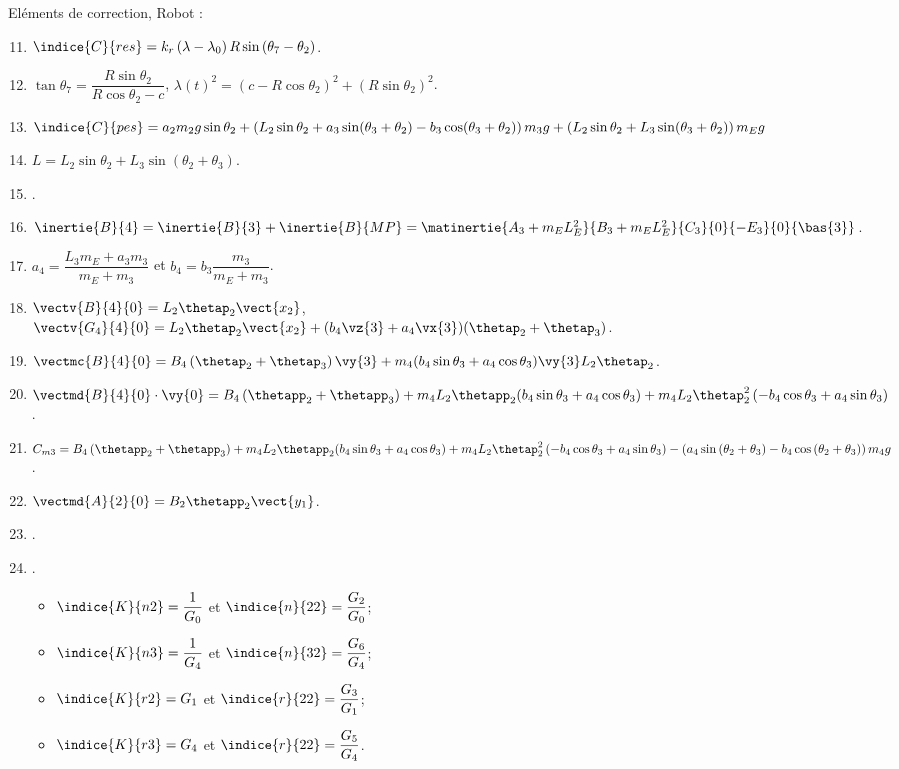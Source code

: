 \ifcolle
\else
Eléments de correction, Robot :
\begin{enumerate} \setcounter{enumi}{10}
\item $\indice{C}{res} = k_r \left(\lambda - \lambda_0\right) R \sin \left(\theta_7 - \theta_2\right) $.
\item $\tan\theta_7 = \dfrac{R \sin \theta_2}{R \cos \theta_2-c}$, $\lambda(t)^2 = \left( c - R \cos \theta_2\right)^2 + \left( R \sin \theta_2\right)^2$.
\item $ \indice{C}{pes}= a_2m_2g \sin\theta_2 +\left( L_2 \sin\theta_2 + a_3 \sin(\theta_3+\theta_2)- b_3 \cos(\theta_3+\theta_2) \right) m_3 g  + \left( L_2 \sin\theta_2+ L_3  \sin(\theta_3+\theta_2) \right) m_E g  $
\item $L = L_2 \sin \theta_2 + L_3 \sin \left(\theta_2+\theta_3\right)$.
\item .
\item $\inertie{B}{4} =\inertie{B}{3} +\inertie{B}{MP} = \matinertie{A_3+m_EL_E^2}{B_3+m_EL_E^2}{C_3}{0}{-E_3}{0}{\bas{3}}$. 
\item $a_4 = \dfrac{L_3m_E + a_3m_3}{m_E+m_3}$ et 
$b_4 = b_3\dfrac{m_3}{m_E+m_3}$.
\item $\vectv{B}{4}{0} =L_2\thetap_2 \vect{x_2}$, $\vectv{G_4}{4}{0} =L_2\thetap_2 \vect{x_2} + (b_4\vz{3}+a_4 \vx{3}) (\thetap_2+\thetap_3)$.
\item $\vectmc{B}{4}{0} = B_4 \left(\thetap_2+\thetap_3\right) \vy{3}+  m_4 ( b_4\sin\theta_3 +a_4 \cos\theta_3 )\vy{3} L_2\thetap_2  $.
\item $\vectmd{B}{4}{0}\cdot\vy{0}=  B_4 \left(\thetapp_2+\thetapp_3\right) 
 + m_4 L_2\thetapp_2 ( b_4\sin\theta_3 +a_4 \cos\theta_3 ) 
+ m_4 L_2\thetap_2^2 \left(- b_4\cos\theta_3+a_4 \sin\theta_3\right)$.
\item $C_{m3} = 
   B_4 \left(\thetapp_2+\thetapp_3\right) 
+ m_4 L_2\thetapp_2 ( b_4\sin\theta_3 +a_4 \cos\theta_3 ) 
+ m_4 L_2\thetap_2^2 \left(- b_4\cos\theta_3+a_4 \sin\theta_3\right)
- \left(a_4\sin\left( \theta_2+\theta_3\right) -b_4\cos\left( \theta_2+\theta_3\right) \right) m_4 g$.
\item $\vectmd{A}{2}{0}=B_2\thetapp_2 \vect{y_1}$.
\item .
\item .
\begin{itemize}
\item $\indice{K}{n2} = \dfrac{1}{G_0}$ et $\indice{n}{22}=\dfrac{G_2}{G_0}$;
\item $\indice{K}{n3} = \dfrac{1}{G_4}$ et $\indice{n}{32}=\dfrac{G_6}{G_4}$;
\item $\indice{K}{r2} = {G_1}$ et $\indice{r}{22}=\dfrac{G_3}{G_1}$;
\item $\indice{K}{r3} = {G_4}$ et $\indice{r}{22}=\dfrac{G_5}{G_4}$.
\end{itemize}
\end{enumerate}
\fi



